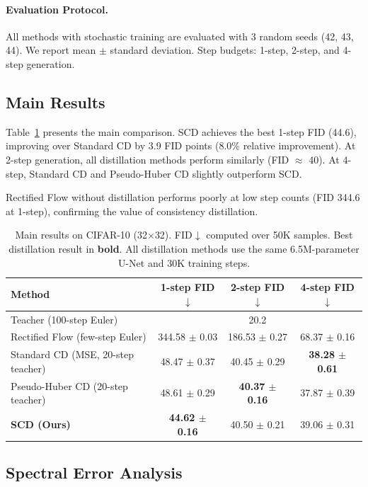\documentclass{article}
\newcommand{\scd}{\textsc{SCD}}
\begin{document}
\paragraph{Evaluation Protocol.}
All methods with stochastic training are evaluated with 3 random seeds (42, 43, 44). We report mean $\pm$ standard deviation. Step budgets: 1-step, 2-step, and 4-step generation.

\subsection{Main Results}
\label{sec:main_results}

Table~\ref{tab:main} presents the main comparison. \scd{} achieves the best 1-step FID (44.6), improving over Standard CD by 3.9 FID points (8.0\% relative improvement). At 2-step generation, all distillation methods perform similarly (FID $\approx$ 40). At 4-step, Standard CD and Pseudo-Huber CD slightly outperform \scd{}.

Rectified Flow without distillation performs poorly at low step counts (FID 344.6 at 1-step), confirming the value of consistency distillation.

\begin{table}[t]
\caption{Main results on CIFAR-10 (32$\times$32). FID$\downarrow$ computed over 50K samples. Best distillation result in \textbf{bold}. All distillation methods use the same 6.5M-parameter U-Net and 30K training steps.}
\label{tab:main}
\centering
\begin{tabular}{lccc}
\toprule
Method & 1-step FID $\downarrow$ & 2-step FID $\downarrow$ & 4-step FID $\downarrow$ \\
\midrule
Teacher (100-step Euler) & \multicolumn{3}{c}{20.2} \\
Rectified Flow (few-step Euler) & 344.58 $\pm$ 0.03 & 186.53 $\pm$ 0.27 & 68.37 $\pm$ 0.16 \\
\midrule
Standard CD (MSE, 20-step teacher) & 48.47 $\pm$ 0.37 & 40.45 $\pm$ 0.29 & \textbf{38.28 $\pm$ 0.61} \\
Pseudo-Huber CD (20-step teacher) & 48.61 $\pm$ 0.29 & \textbf{40.37 $\pm$ 0.16} & 37.87 $\pm$ 0.39 \\
\textbf{\scd{} (Ours)} & \textbf{44.62 $\pm$ 0.16} & 40.50 $\pm$ 0.21 & 39.06 $\pm$ 0.31 \\
\bottomrule
\end{tabular}
\end{table}

\subsection{Spectral Error Analysis}
\end{document}
